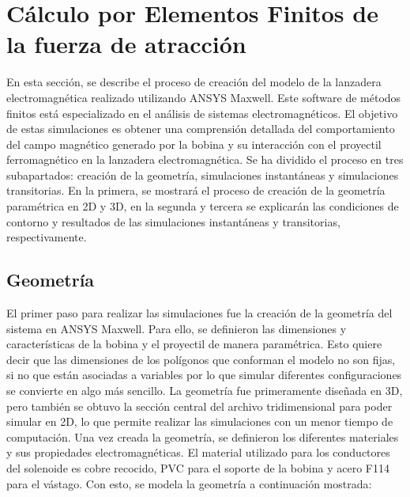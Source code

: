 \section{Cálculo por Elementos Finitos de la fuerza de atracción}
\label{sec:simulaciones}

En esta sección, se describe el proceso de creación del modelo de la lanzadera electromagnética realizado utilizando ANSYS Maxwell. Este software de métodos finitos está especializado en el análisis de sistemas electromagnéticos. El objetivo de estas simulaciones es obtener una comprensión detallada del comportamiento del campo magnético generado por la bobina y su interacción con el proyectil ferromagnético en la lanzadera electromagnética. Se ha dividido el proceso en tres subapartados: creación de la geometría, simulaciones instantáneas y simulaciones transitorias. En la primera, se mostrará el proceso de creación de la geometría paramétrica en 2D y 3D, en la segunda y tercera se explicarán las condiciones de contorno y resultados de las simulaciones instantáneas y transitorias, respectivamente.

\subsection{Geometría}
El primer paso para realizar las simulaciones fue la creación de la geometría del sistema en ANSYS Maxwell. Para ello, se definieron las dimensiones y características de la bobina y el proyectil de manera paramétrica. Esto quiere decir que las dimensiones de los polígonos que conforman el modelo no son fijas, si no que están asociadas a variables por lo que simular diferentes configuraciones se convierte en algo más sencillo. La geometría fue primeramente diseñada en 3D, pero también se obtuvo la sección central del archivo tridimensional para poder simular en 2D, lo que permite realizar las simulaciones con un menor tiempo de computación. Una vez creada la geometría, se definieron los diferentes materiales y sus propiedades electromagnéticas. El material utilizado para los conductores del solenoide es cobre recocido, PVC para el soporte de la bobina y acero F114 para el vástago. Con esto, se modela la geometría a continuación mostrada:

